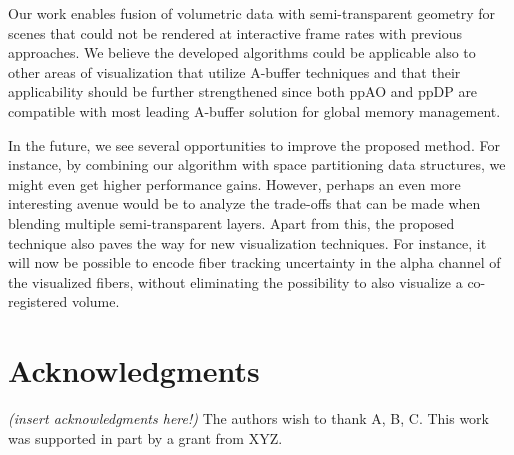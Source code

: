 \documentclass{egpubl}
\newcommand{\todo}[1]{{\color{red}\emph{(#1)}}}
\newcommand{\ab}{\mbox{A-buffer}}
\newcommand{\stencil}{ppAO}
\newcommand{\dloop}{ppDP}
\begin{document}
Our work enables fusion of volumetric data with semi-transparent geometry for scenes that could not be rendered at interactive frame rates with previous approaches. 
We believe the developed algorithms could be applicable also to other areas of visualization that utilize \ab{} techniques and that their applicability should be further strengthened since both \stencil{} and \dloop{} are compatible with most leading \ab{} solution for global memory management. 

In the future, we see several opportunities to improve the proposed method. 
For instance, by combining our algorithm with space partitioning data structures, we might even get higher performance gains. 
However, perhaps an even more interesting avenue would be to analyze the trade-offs that can be made when blending multiple semi-transparent layers. 
Apart from this, the proposed technique also paves the way for new visualization techniques. 
For instance, it will now be possible to encode fiber tracking uncertainty in the alpha channel of the visualized fibers, without eliminating the possibility to also visualize a co-registered volume. 

\section{Acknowledgments}
\label{sec:acknowledgments}

\todo{insert acknowledgments here!}
The authors wish to thank A, B, C. This work was supported in part by
a grant from XYZ.\\
%
%
\end{document}
